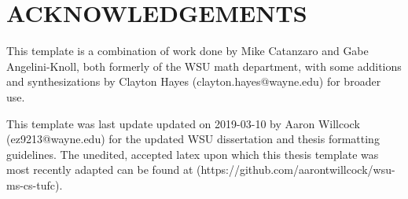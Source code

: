 \section*{ACKNOWLEDGEMENTS}
\begin{center}
This template is a combination of work done by Mike Catanzaro and Gabe Angelini-Knoll, both formerly of the WSU math department, with some additions and synthesizations by Clayton Hayes (clayton.hayes@wayne.edu) for broader use.

This template was last update updated on 2019-03-10 by Aaron Willcock (ez9213@wayne.edu) for the updated WSU dissertation and thesis formatting guidelines. The unedited, accepted latex upon which this thesis template was most recently adapted can be found at (https://github.com/aarontwillcock/wsu-ms-cs-tufc).
\end{center}